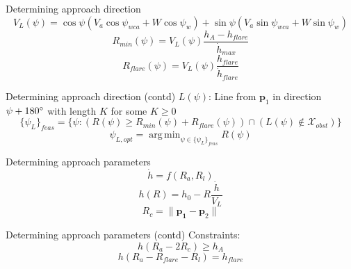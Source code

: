 \documentclass{beamer}
\renewcommand{\vec}[1]{
    \boldsymbol{#1}
}
\DeclareMathOperator*{\argmin}{arg\,min}
\begin{document}
\begin{frame}{Determining approach direction}
    \begin{equation}
        V_L(\psi)=\cos\psi(V_a\cos\psi_{wca}+W\cos\psi_w) + \sin\psi(V_a\sin\psi_{wca}+W\sin\psi_w)
    \end{equation}
    \begin{equation}
        R_{min}(\psi)=V_L(\psi)\frac{h_A-h_{flare}}{\dot{h}_{max}}
    \end{equation}
    \begin{equation}
        R_{flare}(\psi)=V_{L}(\psi)\frac{h_{flare}}{\dot{h}_{flare}}
    \end{equation}
\end{frame}

\begin{frame}{Determining approach direction (contd)}
    $L(\psi)$: Line from $\vec{p}_1$ in direction $\psi+180\degree$ with length $K$ for some $K\geq0$
    \begin{equation}
        \{\psi_L\}_{feas}=\{\psi: (R(\psi)\geq R_{min}(\psi)+R_{flare}(\psi)) \cap (L(\psi)\notin \mathcal{X}_{obst})\}
    \end{equation}
    \begin{equation}
        \psi_{L,opt} = \argmin_{\psi\in\{\psi_{L}\}_{feas}}R(\psi)
    \end{equation}
\end{frame}

\begin{frame}{Determining approach parameters}
    \begin{equation}
        \dot{h} = f(R_a, R_l)
    \end{equation}
    \begin{equation}
        h(R) = h_0 - R\frac{\dot{h}}{V_L}
    \end{equation}
    \begin{equation}
        R_c = \|\vec{p_1}-\vec{p}_2\|
    \end{equation}
\end{frame}

\begin{frame}{Determining approach parameters (contd)}
    Constraints:
    \begin{equation}\label{eq:h_a_constraint}
        h(R_a - 2R_c) \geq h_A
    \end{equation}
    \begin{equation}\label{eq:h_f_constraint}
        h(R_a - R_{flare} - R_l) = h_{flare}
    \end{equation}
\end{frame}
\end{document}
